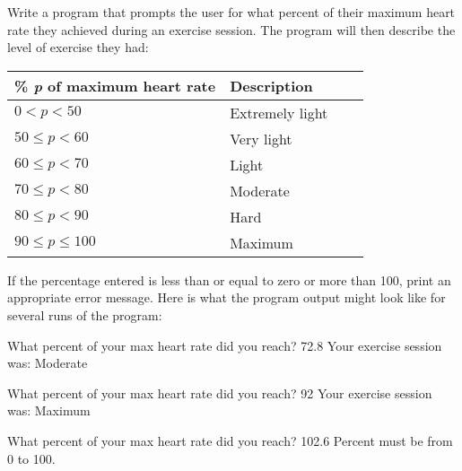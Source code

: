 \begin{exercise}
Write a program that prompts the user for what percent of their maximum heart rate they achieved during an exercise session. The program will then describe the level of exercise they had:

\begin{tabular}{|l|l|l|r|}
\hline
{\bf \% {\em p} of maximum heart rate} & {\bf Description}\\ \hline
$0 < p < 50$ & Extremely light \\ \hline
$50 \leq p < 60$ & Very light \\ \hline
$60 \leq p < 70$ & Light \\ \hline
$70 \leq p < 80$ & Moderate \\ \hline
$80 \leq p < 90$ & Hard \\ \hline
$90 \leq p \leq 100$ & Maximum \\ \hline
\end{tabular}

If the percentage entered is less than or equal to zero or more than 100, print an appropriate error message. Here is what the program output might look like for several runs of the program:

\begin{stdout}
What percent of your max heart rate did you reach? 72.8    
Your exercise session was: Moderate

What percent of your max heart rate did you reach? 92 
Your exercise session was: Maximum

What percent of your max heart rate did you reach? 102.6
Percent must be from 0 to 100.
\end{stdout}

\end{exercise}

